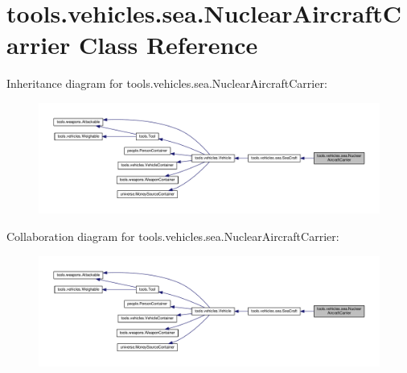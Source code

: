 \hypertarget{classtools_1_1vehicles_1_1sea_1_1_nuclear_aircraft_carrier}{}\section{tools.\+vehicles.\+sea.\+Nuclear\+Aircraft\+Carrier Class Reference}
\label{classtools_1_1vehicles_1_1sea_1_1_nuclear_aircraft_carrier}


Inheritance diagram for tools.\+vehicles.\+sea.\+Nuclear\+Aircraft\+Carrier\+:
\nopagebreak
\begin{figure}[H]
\begin{center}
\leavevmode
\includegraphics[width=350pt]{classtools_1_1vehicles_1_1sea_1_1_nuclear_aircraft_carrier__inherit__graph}
\end{center}
\end{figure}


Collaboration diagram for tools.\+vehicles.\+sea.\+Nuclear\+Aircraft\+Carrier\+:
\nopagebreak
\begin{figure}[H]
\begin{center}
\leavevmode
\includegraphics[width=350pt]{classtools_1_1vehicles_1_1sea_1_1_nuclear_aircraft_carrier__coll__graph}
\end{center}
\end{figure}
